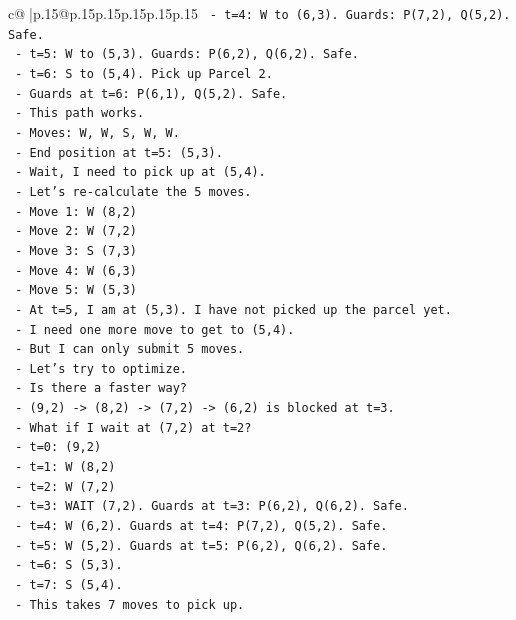 \documentclass{article}
\begin{document}
{\begin{supertabular}{c@{$\;$}|p{.15\linewidth}@{}p{.15\linewidth}p{.15\linewidth}p{.15\linewidth}p{.15\linewidth}p{.15\linewidth}}
{{{\texttt{  {-} t=4: W to (6,3). Guards: P(7,2), Q(5,2). Safe.} \\
\texttt{  {-} t=5: W to (5,3). Guards: P(6,2), Q(6,2). Safe.} \\
\texttt{  {-} t=6: S to (5,4). Pick up Parcel 2.} \\
\texttt{    {-} Guards at t=6: P(6,1), Q(5,2). Safe.} \\
\texttt{  {-} This path works.} \\
\texttt{  {-} Moves: W, W, S, W, W.} \\
\texttt{  {-} End position at t=5: (5,3).} \\
\texttt{  {-} Wait, I need to pick up at (5,4).} \\
\texttt{  {-} Let's re{-}calculate the 5 moves.} \\
\texttt{  {-} Move 1: W (8,2)} \\
\texttt{  {-} Move 2: W (7,2)} \\
\texttt{  {-} Move 3: S (7,3)} \\
\texttt{  {-} Move 4: W (6,3)} \\
\texttt{  {-} Move 5: W (5,3)} \\
\texttt{  {-} At t=5, I am at (5,3). I have not picked up the parcel yet.} \\
\texttt{  {-} I need one more move to get to (5,4).} \\
\texttt{  {-} But I can only submit 5 moves.} \\
\texttt{  {-} Let's try to optimize.} \\
\texttt{  {-} Is there a faster way?} \\
\texttt{  {-} (9,2) {-}> (8,2) {-}> (7,2) {-}> (6,2) is blocked at t=3.} \\
\texttt{  {-} What if I wait at (7,2) at t=2?} \\
\texttt{    {-} t=0: (9,2)} \\
\texttt{    {-} t=1: W (8,2)} \\
\texttt{    {-} t=2: W (7,2)} \\
\texttt{    {-} t=3: WAIT (7,2). Guards at t=3: P(6,2), Q(6,2). Safe.} \\
\texttt{    {-} t=4: W (6,2). Guards at t=4: P(7,2), Q(5,2). Safe.} \\
\texttt{    {-} t=5: W (5,2). Guards at t=5: P(6,2), Q(6,2). Safe.} \\
\texttt{    {-} t=6: S (5,3).} \\
\texttt{    {-} t=7: S (5,4).} \\
\texttt{    {-} This takes 7 moves to pick up.} \\
}}}
\end{supertabular}}
\end{document}

